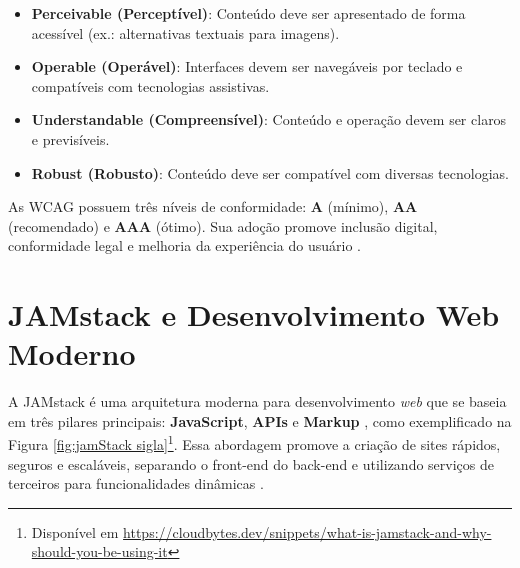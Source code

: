 {    \begin{itemize}
        \item \textbf{Perceivable (Perceptível)}: Conteúdo deve ser apresentado de forma acessível (ex.: alternativas textuais para imagens).
        \item \textbf{Operable (Operável)}: Interfaces devem ser navegáveis por teclado e compatíveis com tecnologias assistivas.
        \item \textbf{Understandable (Compreensível)}: Conteúdo e operação devem ser claros e previsíveis.
        \item \textbf{Robust (Robusto)}: Conteúdo deve ser compatível com diversas tecnologias.
    \end{itemize}
    
    As WCAG possuem três níveis de conformidade: \textbf{A} (mínimo), \textbf{AA} (recomendado) e \textbf{AAA} (ótimo). Sua adoção promove inclusão digital, conformidade legal e melhoria da experiência do usuário \citep{wcag21}.
    
    
    
    \section{JAMstack e Desenvolvimento Web Moderno}
    \label{sec:jamstack}
    A JAMstack é uma arquitetura moderna para desenvolvimento \textit{web} que se baseia em três pilares principais: \textbf{JavaScript}, \textbf{APIs} e \textbf{Markup} \citep{jamstackorg}, como exemplificado na Figura \ref{fig:jamStack sigla}\footnote{Disponível em \href{https://cloudbytes.dev/snippets/what-is-jamstack-and-why-should-you-be-using-it}{https://cloudbytes.dev/snippets/what-is-jamstack-and-why-should-you-be-using-it}}. Essa abordagem promove a criação de sites rápidos, seguros e escaláveis, separando o front-end do back-end e utilizando serviços de terceiros para funcionalidades dinâmicas \citep{netlifyjamstack}.
    
}
